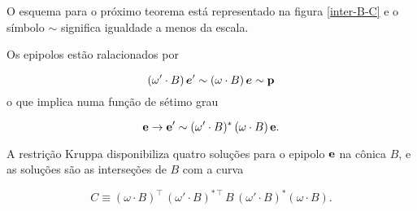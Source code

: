 O esquema para o próximo teorema está representado na figura \ref{inter-B-C} e o símbolo $\sim$ significa igualdade a menos da escala.

\begin{teorema}
Os epipolos estão ralacionados por 

\begin{equation}\label{eq.equiv-reta-polar-sem-B}
(\omega'\cdot B)\,\boldsymbol{e}'\sim (\omega\cdot B)\,\boldsymbol{e}\sim{\bf p}
\end{equation}
o que implica numa função de sétimo grau 

\begin{equation}\label{eq.map-7-grau}
{\bf e} \rightarrow {\bf e'} \sim (\omega' \cdot B)^*\,(\omega \cdot B)\,{\bf e}.
\end{equation}

A restrição Kruppa disponibiliza quatro soluções para o epipolo ${\bf e}$ na cônica $B$, e as soluções são as interseções  de $B$ com a curva 

\begin{equation}\label{eq.definicao-conica-C}
C \equiv (\omega \cdot B)^\top\,(\omega' \cdot B)^{*\,\top}\,B\,(\omega' \cdot B)^*(\omega \cdot B).
\end{equation}

\end{teorema}

